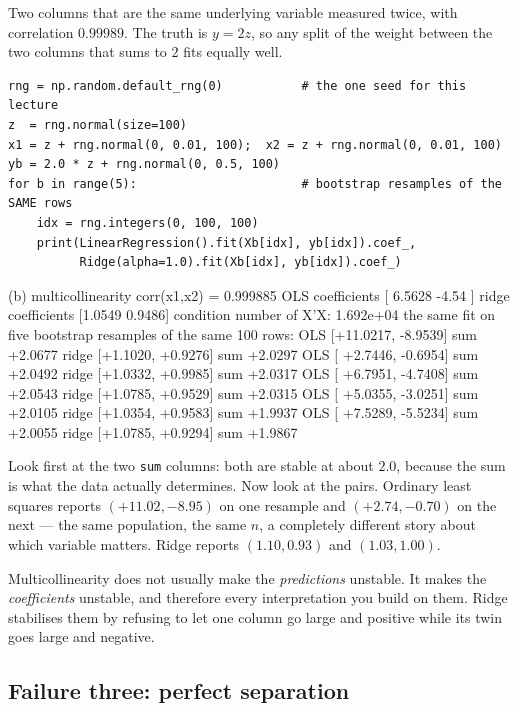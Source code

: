 \documentclass[11pt]{article}
\begin{document}
Two columns that are the same underlying variable measured twice, with
correlation $0.99989$. The truth is $y = 2z$, so any split of the weight
between the two columns that sums to $2$ fits equally well.

\begin{lstlisting}
rng = np.random.default_rng(0)           # the one seed for this lecture
z  = rng.normal(size=100)
x1 = z + rng.normal(0, 0.01, 100);  x2 = z + rng.normal(0, 0.01, 100)
yb = 2.0 * z + rng.normal(0, 0.5, 100)
for b in range(5):                       # bootstrap resamples of the SAME rows
    idx = rng.integers(0, 100, 100)
    print(LinearRegression().fit(Xb[idx], yb[idx]).coef_,
          Ridge(alpha=1.0).fit(Xb[idx], yb[idx]).coef_)
\end{lstlisting}
\begin{codeout}
(b) multicollinearity  corr(x1,x2) = 0.999885
    OLS   coefficients [ 6.5628 -4.54  ]
    ridge coefficients [1.0549 0.9486]
    condition number of X'X: 1.692e+04
    the same fit on five bootstrap resamples of the same 100 rows:
       OLS [+11.0217,  -8.9539]   sum +2.0677      ridge [+1.1020, +0.9276]   sum +2.0297
       OLS [ +2.7446,  -0.6954]   sum +2.0492      ridge [+1.0332, +0.9985]   sum +2.0317
       OLS [ +6.7951,  -4.7408]   sum +2.0543      ridge [+1.0785, +0.9529]   sum +2.0315
       OLS [ +5.0355,  -3.0251]   sum +2.0105      ridge [+1.0354, +0.9583]   sum +1.9937
       OLS [ +7.5289,  -5.5234]   sum +2.0055      ridge [+1.0785, +0.9294]   sum +1.9867
\end{codeout}

Look first at the two \texttt{sum} columns: both are stable at about $2.0$,
because the sum is what the data actually determines. Now look at the pairs.
Ordinary least squares reports $(+11.02, -8.95)$ on one resample and
$(+2.74, -0.70)$ on the next --- the same population, the same $n$, a
completely different story about which variable matters. Ridge reports
$(1.10, 0.93)$ and $(1.03, 1.00)$.

\begin{keyidea}
Multicollinearity does not usually make the \emph{predictions} unstable. It
makes the \emph{coefficients} unstable, and therefore every interpretation you
build on them. Ridge stabilises them by refusing to let one column go large
and positive while its twin goes large and negative.
\end{keyidea}

\subsection{Failure three: perfect separation}
\end{document}
